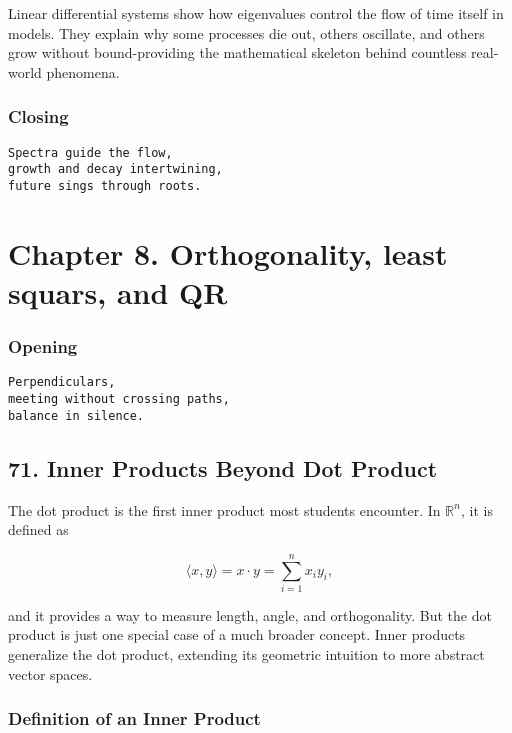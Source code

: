\documentclass[
  letterpaper,
  DIV=11,
  numbers=noendperiod]{scrreprt}
\begin{document}
Linear differential systems show how eigenvalues control the flow of
time itself in models. They explain why some processes die out, others
oscillate, and others grow without bound-providing the mathematical
skeleton behind countless real-world phenomena.

\subsubsection{Closing}\label{closing-6}

\begin{verbatim}
Spectra guide the flow,
growth and decay intertwining,
future sings through roots.
\end{verbatim}

\section{Chapter 8. Orthogonality, least squars, and
QR}\label{chapter-8.-orthogonality-least-squars-and-qr}

\subsubsection{Opening}\label{opening-6}

\begin{verbatim}
Perpendiculars,
meeting without crossing paths,
balance in silence.
\end{verbatim}

\subsection{71. Inner Products Beyond Dot
Product}\label{inner-products-beyond-dot-product}

The dot product is the first inner product most students encounter. In
\(\mathbb{R}^n\), it is defined as

\[
\langle x, y \rangle = x \cdot y = \sum_{i=1}^n x_i y_i,
\]

and it provides a way to measure length, angle, and orthogonality. But
the dot product is just one special case of a much broader concept.
Inner products generalize the dot product, extending its geometric
intuition to more abstract vector spaces.

\subsubsection{Definition of an Inner
Product}\label{definition-of-an-inner-product}
\end{document}
